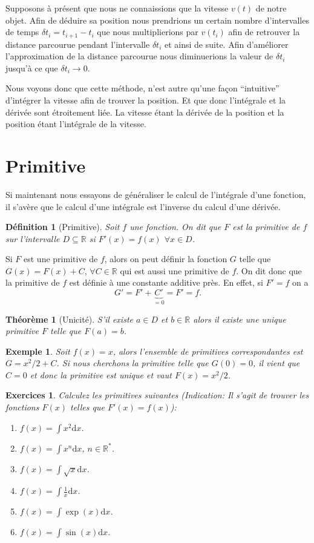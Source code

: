 \documentclass[a4paper,12pt]{book}
\newcommand{\real}{\mathbb{R}}
\newcommand{\dd}{\mathrm{d}}
\newtheorem{definition}{Définition}
\newtheorem*{exemple}{Exemple}
\newtheorem*{exercices}{Exercices}
\newtheorem{theoreme}{Théorème}
\begin{document}
Supposons à présent que nous ne connaissions que la vitesse $v(t)$ de notre objet. Afin de déduire sa position
nous prendrions un certain nombre d'intervalles de temps $\delta t_i=t_{i+1}-t_i$ que nous multiplierions
par $v(t_i)$ afin de retrouver la distance parcourue pendant l'intervalle $\delta t_i$
et ainsi de suite. Afin d'améliorer l'approximation de la distance parcourue 
nous diminuerions la valeur de $\delta t_i$ jusqu'à ce que $\delta t_i\rightarrow 0$.

Nous voyons donc que cette méthode, n'est autre qu'une façon ``intuitive'' d'intégrer la vitesse afin de trouver la position.
Et que donc l'intégrale et la dérivée sont étroitement liée. La vitesse étant la dérivée de la position et la position étant l'intégrale de la vitesse.


\section{Primitive}
Si maintenant nous essayons de généraliser le calcul de l'intégrale d'une fonction,
il s'avère que le calcul d'une intégrale est l'inverse du calcul d'une dérivée.

\begin{definition}[Primitive]
Soit $f$ une fonction. On dit que $F$ est la primitive de $f$ sur l'intervalle $D\subseteq\real$ si $F'(x)=f(x)$  $\forall x\in D$.
\end{definition}

Si $F$ est une primitive de $f$, alors on peut définir la fonction $G$ telle que $G(x)=F(x)+C$, $\forall C\in\real$ 
qui est aussi une primitive de $f$. On dit donc que la primitive de $f$ est définie à une constante additive près. En effet,
si $F'=f$ on a
\begin{equation}
 G'=F'+\underbrace{C'}_{=0}=F'=f.
\end{equation}
\begin{theoreme}[Unicité]
S'il existe $a\in D$ et $b\in\real$ alors il existe une unique primitive
$F$ telle que $F(a)=b$.
\end{theoreme}
\begin{exemple}
 Soit $f(x)=x$, alors l'ensemble de primitives correspondantes est $G=x^2/2+C$. Si nous cherchons la 
 primitive telle que $G(0)=0$, il vient que $C=0$ et donc la primitive est unique et vaut
 $F(x)=x^2/2$.
\end{exemple}
\begin{exercices}
Calculez les primitives suivantes (\textit{Indication: Il s'agit de trouver les fonctions $F(x)$ telles que $F'(x)=f(x)$}):
 \begin{enumerate}
  \item $f(x)=\int x^2\dd x$.
  \item $f(x)=\int x^n\dd x$, $n\in \real^*$.
  \item $f(x)=\int \sqrt{x}\dd x$.
  \item $f(x)=\int \frac{1}{x}\dd x$.
  \item $f(x)=\int \exp(x)\dd x$.
  \item $f(x)=\int \sin(x)\dd x$.
 \end{enumerate}
\end{exercices}
\end{document}
